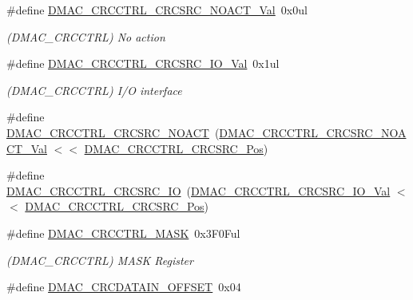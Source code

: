 \begin{DoxyCompactItemize}
\item 
\#define \mbox{\hyperlink{group___s_a_m_d21___d_m_a_c_gabd02bb4af60ae9d0d21a167d617a37d1}{D\+M\+A\+C\+\_\+\+C\+R\+C\+C\+T\+R\+L\+\_\+\+C\+R\+C\+S\+R\+C\+\_\+\+N\+O\+A\+C\+T\+\_\+\+Val}}~0x0ul
\begin{DoxyCompactList}\small\item\em (D\+M\+A\+C\+\_\+\+C\+R\+C\+C\+T\+RL) No action \end{DoxyCompactList}\item 
\#define \mbox{\hyperlink{group___s_a_m_d21___d_m_a_c_ga27de0e68d8f9d1d90dd2e683b1b8206c}{D\+M\+A\+C\+\_\+\+C\+R\+C\+C\+T\+R\+L\+\_\+\+C\+R\+C\+S\+R\+C\+\_\+\+I\+O\+\_\+\+Val}}~0x1ul
\begin{DoxyCompactList}\small\item\em (D\+M\+A\+C\+\_\+\+C\+R\+C\+C\+T\+RL) I/O interface \end{DoxyCompactList}\item 
\#define \mbox{\hyperlink{group___s_a_m_d21___d_m_a_c_ga5a7b9210edee66a08c19577a9718cbc1}{D\+M\+A\+C\+\_\+\+C\+R\+C\+C\+T\+R\+L\+\_\+\+C\+R\+C\+S\+R\+C\+\_\+\+N\+O\+A\+CT}}~(\mbox{\hyperlink{group___s_a_m_d21___d_m_a_c_gabd02bb4af60ae9d0d21a167d617a37d1}{D\+M\+A\+C\+\_\+\+C\+R\+C\+C\+T\+R\+L\+\_\+\+C\+R\+C\+S\+R\+C\+\_\+\+N\+O\+A\+C\+T\+\_\+\+Val}} $<$$<$ \mbox{\hyperlink{group___s_a_m_d21___d_m_a_c_gadc538250fa40a515d90fc7bbde4c5f83}{D\+M\+A\+C\+\_\+\+C\+R\+C\+C\+T\+R\+L\+\_\+\+C\+R\+C\+S\+R\+C\+\_\+\+Pos}})
\item 
\#define \mbox{\hyperlink{group___s_a_m_d21___d_m_a_c_gaf274b789f2a39e9f18e2f06686815cc7}{D\+M\+A\+C\+\_\+\+C\+R\+C\+C\+T\+R\+L\+\_\+\+C\+R\+C\+S\+R\+C\+\_\+\+IO}}~(\mbox{\hyperlink{group___s_a_m_d21___d_m_a_c_ga27de0e68d8f9d1d90dd2e683b1b8206c}{D\+M\+A\+C\+\_\+\+C\+R\+C\+C\+T\+R\+L\+\_\+\+C\+R\+C\+S\+R\+C\+\_\+\+I\+O\+\_\+\+Val}}    $<$$<$ \mbox{\hyperlink{group___s_a_m_d21___d_m_a_c_gadc538250fa40a515d90fc7bbde4c5f83}{D\+M\+A\+C\+\_\+\+C\+R\+C\+C\+T\+R\+L\+\_\+\+C\+R\+C\+S\+R\+C\+\_\+\+Pos}})
\item 
\#define \mbox{\hyperlink{group___s_a_m_d21___d_m_a_c_ga3d0e4123fdb32eb7c37e85062b3a0b61}{D\+M\+A\+C\+\_\+\+C\+R\+C\+C\+T\+R\+L\+\_\+\+M\+A\+SK}}~0x3\+F0\+Ful
\begin{DoxyCompactList}\small\item\em (D\+M\+A\+C\+\_\+\+C\+R\+C\+C\+T\+RL) M\+A\+SK Register \end{DoxyCompactList}\item 
\#define \mbox{\hyperlink{group___s_a_m_d21___d_m_a_c_gac3b380f3a651a60145992fd8eb03334b}{D\+M\+A\+C\+\_\+\+C\+R\+C\+D\+A\+T\+A\+I\+N\+\_\+\+O\+F\+F\+S\+ET}}~0x04

\end{DoxyCompactItemize}
